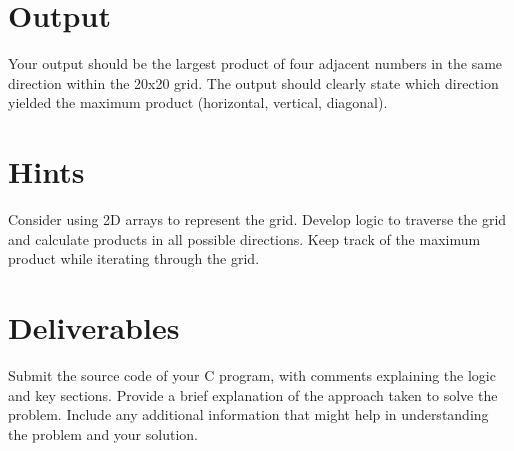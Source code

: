 \documentclass{article}
\begin{document}
\section*{Output}
  Your output should be the largest product of four adjacent numbers in the same direction within the 20x20 grid.
  The output should clearly state which direction yielded the maximum product (horizontal, vertical, diagonal).

\section*{Hints}
   Consider using 2D arrays to represent the grid.
   Develop logic to traverse the grid and calculate products in all possible directions.
   Keep track of the maximum product while iterating through the grid.

\section*{Deliverables}
   Submit the source code of your C program, with comments explaining the logic and key sections.
   Provide a brief explanation of the approach taken to solve the problem.
   Include any additional information that might help in understanding the problem and your solution.
\end{document}
